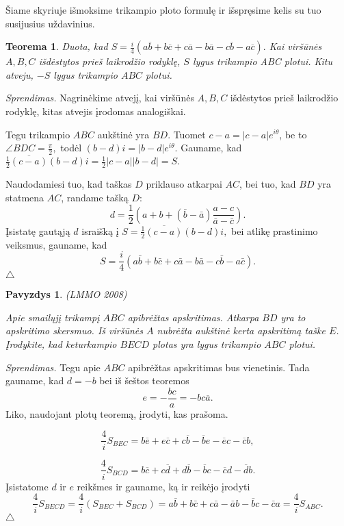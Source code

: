 \documentclass[11pt,a4paper,twoside]{book}
\newenvironment{sprendimas}{\noindent \textit{Sprendimas.}}{\hfill $\triangle$}
\newcounter{foo}[subsection]
\newtheorem{thmnr}{Teorema}
\newtheorem{pavnr}[foo]{Pavyzdys}
\theoremstyle{definition} \newtheorem*{api}{Apibrėžimas}
\theoremstyle{remark} \newtheorem*{pastaba}{Pastaba}
\begin{document}
Šiame skyriuje išmoksime trikampio ploto formulę ir išspręsime kelis su tuo susijusius uždavinius.

\begin{thmnr} 
Duota, kad
$S=\frac{i}{4}(a\overline{b} +b\overline{c}+c\overline{a} - b\overline{a} -c\overline{b}-a\overline{c}).$ Kai viršūnės $A, B, C$ išdėstytos prieš laikrodžio rodyklę, $S$ lygus trikampio ABC plotui. Kitu atveju, $-S$ lygus trikampio $ABC$ plotui.
\end{thmnr}

\begin{sprendimas}
Nagrinėkime atvejį, kai viršūnės $A, B, C$ išdėstytos prieš laikrodžio rodyklę, kitas atvejis įrodomas analogiškai.

Tegu trikampio $ABC$ aukštinė yra $BD$. Tuomet $c-a=|c-a|e^{i\theta}$, be to $\angle BDC = \frac {\pi}{2},$ todėl $(b-d)i=|b-d|e^{i\theta}$. Gauname, kad $\frac{1}{2}\overline{(c-a)} (b-d)i=\frac{1}{2}|c-a||b-d|=S.$

Naudodamiesi tuo, kad taškas $D$ priklauso atkarpai $AC$, bei tuo, kad $BD$ yra statmena $AC$, randame tašką $D$:
$$ d =\frac {1}{2}(a+b + (\bar{b}-\bar{a}) \frac{a-c}{ \bar{a}-\bar{c}}).$$
Įsistatę gautąją $d$ israišką į $S=\frac{1}{2}\overline{(c-a)} (b-d)i,$ bei atlikę prastinimo veiksmus, gauname, kad
$$S= \frac {i}{4}(a\bar{b}+ b \bar{c} + c \bar{a} - b\bar{a} - c \bar{b} - a \bar{c}).$$
\end{sprendimas}





\begin{pavnr}
(LMMO 2008)

Apie smailųjį trikampį $ABC$ apibrėžtas apskritimas. Atkarpa $BD$ yra to
apskritimo skersmuo. Iš viršūnės $A$ nubrėžta aukštinė kerta apskritimą
taške $E$. Įrodykite, kad keturkampio $BECD$ plotas yra lygus trikampio
$ABC$ plotui.
\end{pavnr}
\begin{sprendimas}
Tegu apie $ABC$ apibrėžtas apskritimas bus vienetinis. Tada gauname, kad $d = -b$ bei iš šeštos teoremos
 $$ e= -\frac {bc}{a}= -bc \overline{a}.$$
Liko, naudojant plotų teoremą, įrodyti, kas prašoma.

$$\frac{4}{i}S_{BEC}=b\overline{e}+e\overline{c}+c\overline{b}-\overline{b}e-\overline{e}c-\overline{c}b,$$

$$\frac{4}{i}S_{BCD}=b\overline{c}+c\overline{d}+d\overline{b}-\overline{b}c-\overline{c}d-\overline{d}b.$$
Įsistatome $d$ ir $e$ reikšmes ir gauname, ką ir reikėjo įrodyti
$$ \frac{4}{i}S_{BECD}=\frac{4}{i}(S_{BEC}+S_{BCD})=   
a\bar b + b \bar c + c \bar a - \bar a b - \bar b c - \bar c a = \frac{4}{i}S_{ABC}.$$
\end{sprendimas}
\end{document}
